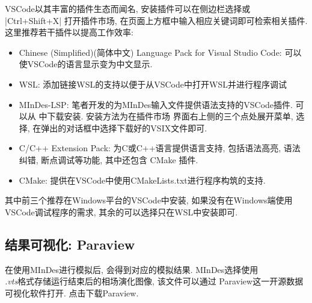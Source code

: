 VSCode以其丰富的插件生态而闻名, 安装插件可以在侧边栏选择或 
\cverb|Ctrl+Shift+X| 打开插件市场, 在页面上方框中输入相应关键词即可检索相关插件. 这里推荐若干插件以提高工作效率:
\begin{itemize}
    \item Chinese (Simplified)(简体中文) Language Pack for Visual Studio Code: 可以使VSCode的语言显示变为中文显示.
    \item WSL: 添加链接WSL的支持以便于从VSCode中打开WSL并进行程序调试
    \item MInDes-LSP: 笔者开发的为MInDes输入文件提供语法支持的VSCode插件. 可以从
          中下载安装. 安装方法为在插件市场
          界面右上侧的三个点处展开菜单, 选择{}, 在弹出的对话框中选择下载好的VSIX文件即可.
    \item C/C++ Extension Pack: 为C或C++语言提供语言支持, 包括语法高亮, 语法纠错, 断点调试等功能, 其中还包含 CMake 插件.
    \item CMake: 提供在VSCode中使用CMakeLists.txt进行程序构筑的支持.
\end{itemize}
其中前三个推荐在Windows平台的VSCode中安装, 如果没有在Windows端使用VSCode调试程序的需求, 其余的可以选择只在WSL中安装即可.

\subsection{结果可视化: Paraview}
在使用MInDes进行模拟后, 会得到对应的模拟结果. MInDes选择使用\\\emph{.vts}格式存储运行结束后的相场演化图像, 该文件可以通过
Paraview这一开源数据可视化软件打开. 点击下载Paraview.
\endinput